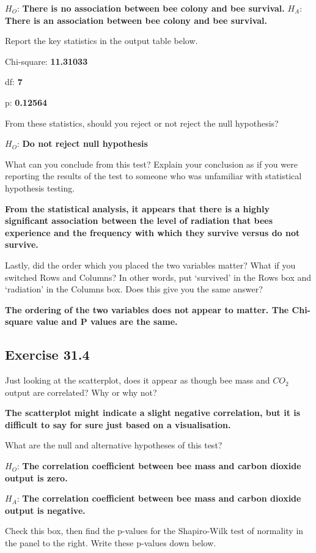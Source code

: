 \documentclass[
  openany]{krantz}
\begin{document}
\(H_{O}\): \textbf{There is no association between bee colony and bee survival.}
\(H_{A}\): \textbf{There is an association between bee colony and bee survival.}

Report the key statistics in the output table below.

Chi-square: \textbf{11.31033}

df: \textbf{7}

p: \textbf{0.12564}

From these statistics, should you reject or not reject the null hypothesis?

\(H_{O}\): \textbf{Do not reject null hypothesis}

What can you conclude from this test? Explain your conclusion as if you were reporting the results of the test to someone who was unfamiliar with statistical hypothesis testing.

\textbf{From the statistical analysis, it appears that there is a highly significant association between the level of radiation that bees experience and the frequency with which they survive versus do not survive.}

Lastly, did the order which you placed the two variables matter? What if you switched Rows and Columns? In other words, put `survived' in the Rows box and `radiation' in the Columns box. Does this give you the same answer?

\textbf{The ordering of the two variables does not appear to matter. The Chi-square value and P values are the same.}

\hypertarget{exercise-31.4}{%
\subsection{Exercise 31.4}\label{exercise-31.4}}

Just looking at the scatterplot, does it appear as though bee mass and \(CO_{2}\) output are correlated? Why or why not?

\textbf{The scatterplot might indicate a slight negative correlation, but it is difficult to say for sure just based on a visualisation.}

What are the null and alternative hypotheses of this test?

\(H_{O}\): \textbf{The correlation coefficient between bee mass and carbon dioxide output is zero.}

\(H_{A}\): \textbf{The correlation coefficient between bee mass and carbon dioxide output is negative.}

Check this box, then find the p-values for the Shapiro-Wilk test of normality in the panel to the right. Write these p-values down below.
\end{document}
